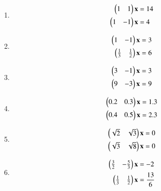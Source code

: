 %
\begin{enumerate}[itemsep=2pt]
\item
\begin{align}
\begin{split}
\begin{pmatrix}1 & 1 \end{pmatrix}\mathbf{x}&=14
\\
\begin{pmatrix}1 & -1 \end{pmatrix}\mathbf{x}&=4
\end{split}
\label{linform/10/ab/1.0.1}
\end{align}
%
%
\item
\begin{align}
\begin{split}
\begin{pmatrix}1 & -1 \end{pmatrix}\mathbf{x}&=3
\\
\begin{pmatrix}\frac{1}{3} & \frac{1}{2} \end{pmatrix}\mathbf{x}&=6
\end{split}
\label{linform/10/ab/1.0.2}
\end{align}
\item
\begin{align}
\begin{split}
\begin{pmatrix}3 & -1 \end{pmatrix}\mathbf{x}&=3
\\
\begin{pmatrix}9 & -3 \end{pmatrix}\mathbf{x}&=9
\end{split}
\label{linform/10/1.0.1}
\end{align}
\item
\begin{align}
\begin{split}
\begin{pmatrix}0.2 & 0.3 \end{pmatrix}\mathbf{x}&=1.3
\\
\begin{pmatrix}0.4 & 0.5 \end{pmatrix}\mathbf{x}&=2.3
\end{split}
\label{linform/10/1.0.2}
\end{align}
\item
\begin{align}
\begin{split}
\begin{pmatrix}\sqrt{2} & \sqrt{3} \end{pmatrix}\mathbf{x}&=0
\\
\begin{pmatrix}\sqrt{3} & \sqrt{8} \end{pmatrix}\mathbf{x}&=0
\end{split}
\end{align}
\item
\begin{align}
\begin{split}
\begin{pmatrix}\frac{3}{2} & -\frac{5}{3} \end{pmatrix}\mathbf{x}&=-2
\\
\begin{pmatrix}\frac{1}{3} & \frac{1}{2} \end{pmatrix}\mathbf{x}&=\frac{13}{6}
\end{split}
\end{align}
\end{enumerate}
%
\solution

%


